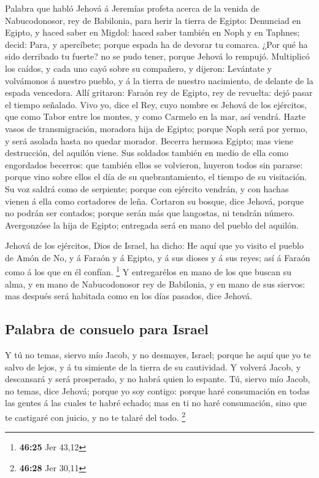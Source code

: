  Palabra que habló Jehová á Jeremías profeta acerca de la
venida de Nabucodonosor, rey de Babilonia, para herir la tierra de
Egipto:  Denunciad en Egipto, y haced saber en Migdol:
haced saber también en Noph y en Taphnes; decid: Para, y apercíbete;
porque espada ha de devorar tu comarca.  ¿Por qué ha sido
derribado tu fuerte? no se pudo tener, porque Jehová lo rempujó.
 Multiplicó los caídos, y cada uno cayó sobre su
compañero, y dijeron: Levántate y volvámonos á nuestro pueblo, y á la
tierra de nuestro nacimiento, de delante de la espada vencedora.
 Allí gritaron: Faraón rey de Egipto, rey de revuelta:
dejó pasar el tiempo señalado.  Vivo yo, dice el Rey,
cuyo nombre es Jehová de los ejércitos, que como Tabor entre los montes,
y como Carmelo en la mar, así vendrá.  Hazte vasos de
transmigración, moradora hija de Egipto; porque Noph será por yermo, y
será asolada hasta no quedar morador.  Becerra hermosa
Egipto; mas viene destrucción, del aquilón viene.  Sus
soldados también en medio de ella como engordados becerros: que también
ellos se volvieron, huyeron todos sin pararse: porque vino sobre ellos
el día de su quebrantamiento, el tiempo de su visitación.
 Su voz saldrá como de serpiente; porque con ejército
vendrán, y con hachas vienen á ella como cortadores de leña.
 Cortaron su bosque, dice Jehová, porque no podrán ser
contados; porque serán más que langostas, ni tendrán número.
 Avergonzóse la hija de Egipto; entregada será en mano
del pueblo del aquilón.

 Jehová de los ejércitos, Dios de Israel, ha dicho: He
aquí que yo visito el pueblo de Amón de No, y á Faraón y á Egipto, y á
sus dioses y á sus reyes; así á Faraón como á los que en él confían.
\footnote{\textbf{46:25} Jer 43,12}  Y entregarélos en
mano de los que buscan su alma, y en mano de Nabucodonosor rey de
Babilonia, y en mano de sus siervos: mas después será habitada como en
los días pasados, dice Jehová.

\hypertarget{palabra-de-consuelo-para-israel}{%
\subsection{Palabra de consuelo para
Israel}\label{palabra-de-consuelo-para-israel}}

 Y tú no temas, siervo mío Jacob, y no desmayes, Israel;
porque he aquí que yo te salvo de lejos, y á tu simiente de la tierra de
su cautividad. Y volverá Jacob, y descansará y será prosperado, y no
habrá quien lo espante.  Tú, siervo mío Jacob, no temas,
dice Jehová; porque yo soy contigo: porque haré consumación en todas las
gentes á las cuales te habré echado; mas en ti no haré consumación, sino
que te castigaré con juicio, y no te talaré del todo. \footnote{\textbf{46:28}
  Jer 30,11}

